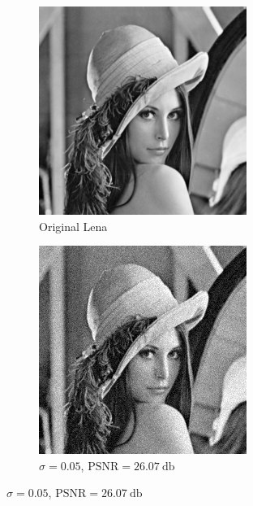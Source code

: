 \documentclass[12pt,english]{article}
\begin{document}
\begin{figure}
	\centering
	\begin{subfigure}[t]{0.4\textwidth}
		\centering
		\includegraphics[width=.9\textwidth]{img/lena}
		\caption{Original Lena}
		\label{fig:orleno}
	\end{subfigure}%
	\qquad%
	\begin{subfigure}[t]{0.4\textwidth}
		\centering
		\includegraphics[width=.9\textwidth]{img/lenan1}
		\caption{$\sigma = 0.05$, $\text{PSNR}=\SI{26.07}{\decibel}$}
		\label{fig:lenag1}
	\end{subfigure}%
	

\end{figure}
\end{document}
